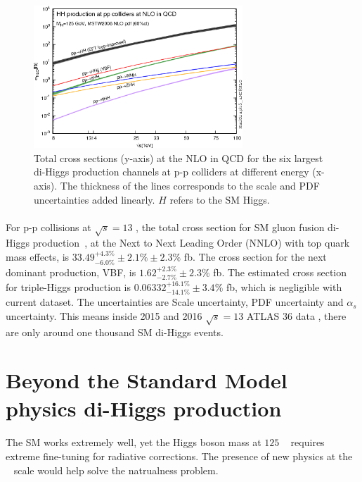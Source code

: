 \begin{figure}[h!]
  \centering
  \captionsetup{justification=centering}
  \includegraphics[width=0.7\textwidth]{figures/theory/HH_xsec}
  \caption{Total cross sections (y-axis) at the NLO in QCD for the six largest di-Higgs production channels at p-p colliders at different energy (x-axis). The thickness of the lines corresponds to the scale and PDF uncertainties added linearly. $H$ refers to the SM Higgs.}
  \label{fig:SM_HH_xsec}
\end{figure}

\paragraph{}
\label{par:diHiggs-crosssection}
For p-p collisions at $\sqrt{s}=13$ \TeV, the total cross section for SM gluon fusion di-Higgs production~\cite{LHCYellow}, at the Next to Next Leading Order (NNLO) with top quark mass effects, is $33.49^{+ 4.3 \%}_{-6.0 \%} \pm 2.1\% \pm 2.3\%$ fb. The cross section for the next dominant production, VBF, is $1.62^{+ 2.3 \%}_{-2.7 \%} \pm 2.3\%$ fb. The estimated cross section for triple-Higgs production is $0.06332 ^{+ 16.1 \%}_{-14.1 \%} \pm 3.4\% $ fb, which is negligible with current dataset. The uncertainties are Scale uncertainty, PDF uncertainty and $\alpha_s$ uncertainty. This means inside 2015 and 2016 $\sqrt{s}=13$ \TeV ATLAS 36 \ifb data , there are only around one thousand SM di-Higgs events.


\section{Beyond the Standard Model physics di-Higgs production}
\paragraph{}
The SM works extremely well, yet the Higgs boson mass at $125$ \GeV~ requires extreme fine-tuning for radiative corrections. The presence of new physics at the \TeV~ scale would help solve the natrualness problem.


